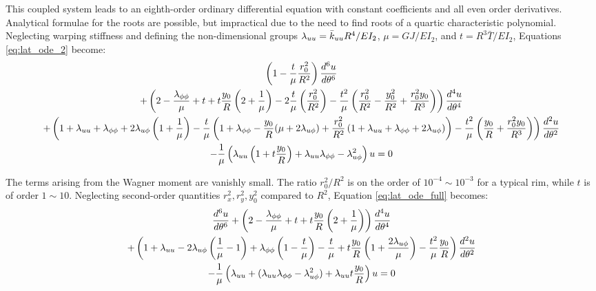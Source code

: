 \documentclass[\rootdir/thesis.tex]{subfiles}
\begin{document}
This coupled system leads to an eighth-order ordinary differential equation with constant coefficients and all even order derivatives. Analytical formulae for the roots are possible, but impractical due to the need to find roots of a quartic characteristic polynomial. Neglecting warping stiffness and defining the non-dimensional groups $\lambda_{uu}=\bar{k}_{uu} R^4/EI_2$, $\mu=GJ/EI_2$, and $t=R^3\bar{T}/EI_2$, Equations \eqref{eq:lat_ode_2} become:
\begin{multline}
\label{eq:lat_ode_full}
  \left(1 - \frac{t}{\mu}\frac{r_0^2}{R^2}\right)\frac{d^6u}{d\theta^6}\\
  +\left(2 - \frac{\lambda_{\phi\phi}}{\mu} + t + t\frac{y_0}{R}\left(2 + \frac{1}{\mu}\right)
         -2\frac{t}{\mu}\left(\frac{r_0^2}{R^2}\right)
         -\frac{t^2}{\mu}\left(\frac{r_0^2}{R^2} - \frac{y_0^2}{R^2} +
                               \frac{r_0^2y_0}{R^3}\right) \right) \frac{d^4u}{d\theta^4}\\
  +\left(1 + \lambda_{uu} + \lambda_{\phi\phi} + 2\lambda_{u\phi}\left(1+\frac{1}{\mu}\right)
         -\frac{t}{\mu}\left(1 + \lambda_{\phi\phi}
                             -\frac{y_0}{R}(\mu + 2\lambda_{u\phi})
                             +\frac{r_0^2}{R^2}\left(1 + \lambda_{uu} + \lambda_{\phi\phi} + 2\lambda_{u\phi}\right)\right)
         -\frac{t^2}{\mu}\left(\frac{y_0}{R} + \frac{r_0^2y_0}{R^3}\right)\right)\frac{d^2u}{d\theta^2}\\
  -\frac{1}{\mu}\left(\lambda_{uu}\left(1+t\frac{y_0}{R}\right)
                      +\lambda_{uu}\lambda_{\phi\phi} - \lambda_{u\phi}^2\right)u = 0
\end{multline}

The terms arising from the Wagner moment are vanishly small. The ratio $r_0^2/R^2$ is on the order of $10^{-4}\sim10^{-3}$ for a typical rim, while $t$ is of order $1\sim10$. Neglecting second-order quantities $r_x^2,r_y^2,y_0^2$ compared to $R^2$, Equation \eqref{eq:lat_ode_full} becomes:
\begin{multline}
\label{eq:lat_ode}
  \frac{d^6u}{d\theta^6}
  +\left(2 - \frac{\lambda_{\phi\phi}}{\mu} + t
         + t\frac{y_0}{R}\left(2 + \frac{1}{\mu}\right)\right) \frac{d^4u}{d\theta^4}\\
  +\left(1 + \lambda_{uu} -2\lambda_{u\phi}\left(\frac{1}{\mu}-1\right)
         +\lambda_{\phi\phi}\left(1-\frac{t}{\mu}\right) -\frac{t}{\mu}
         +t\frac{y_0}{R}\left(1 + \frac{2\lambda_{u\phi}}{\mu}\right)
         -\frac{t^2}{\mu}\frac{y_0}{R}\right)\frac{d^2u}{d\theta^2}\\
  -\frac{1}{\mu}\left(\lambda_{uu}
                      +(\lambda_{uu}\lambda_{\phi\phi} - \lambda_{u\phi}^2)
                      +\lambda_{uu}t\frac{y_0}{R}\right)u = 0
\end{multline}
\end{document}
